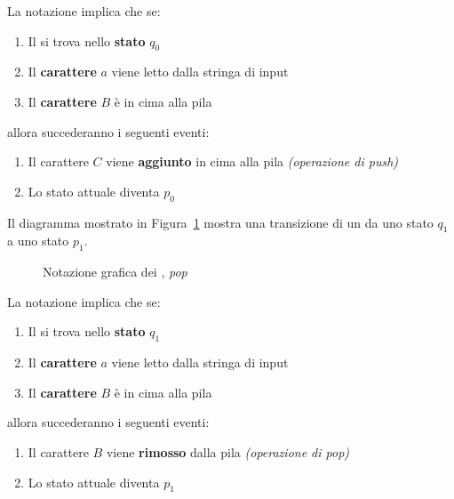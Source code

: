 \documentclass[italian, 10pt]{article}
\begin{document}
La notazione implica che se:

\begin{enumerate}
  \item Il \PDA si trova nello \textbf{stato} \(q_0\)
  \item Il \textbf{carattere} \(a\) viene letto dalla stringa di input
  \item Il \textbf{carattere} \(B\) è in cima alla pila
\end{enumerate}

allora succederanno i seguenti eventi:

\begin{enumerate}
  \item Il carattere \(C\) viene \textbf{aggiunto} in cima alla pila \textit{(operazione di push)}
  \item Lo stato attuale diventa \(p_0\)
\end{enumerate}

\bigskip

Il diagramma mostrato in Figura~\ref{fig:notazione-grafica-PDA-pop} mostra una transizione di un \PDA da uno stato \(q_1\) a uno stato \(p_1\).

\begin{figure}[htbp]
  \bigskip
  \centering
  \caption{Notazione grafica dei \PDA, \textit{pop}}
  \label{fig:notazione-grafica-PDA-pop}
  \bigskip
\end{figure}

La notazione implica che se:

\begin{enumerate}
  \item Il \PDA si trova nello \textbf{stato} \(q_1\)
  \item Il \textbf{carattere} \(a\) viene letto dalla stringa di input
  \item Il \textbf{carattere} \(B\) è in cima alla pila
\end{enumerate}

allora succederanno i seguenti eventi:

\begin{enumerate}
  \item Il carattere \(B\) viene \textbf{rimosso} dalla pila \textit{(operazione di pop)}
  \item Lo stato attuale diventa \(p_1\)
\end{enumerate}
\end{document}
